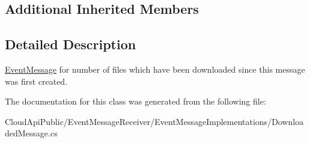 \subsection*{Additional Inherited Members}


\subsection{Detailed Description}
\hyperlink{class_cloud_api_public_1_1_event_message_receiver_1_1_event_message}{Event\-Message} for number of files which have been downloaded since this message was first created. 



The documentation for this class was generated from the following file\-:\begin{DoxyCompactItemize}
\item 
Cloud\-Api\-Public/\-Event\-Message\-Receiver/\-Event\-Message\-Implementations/Downloaded\-Message.\-cs\end{DoxyCompactItemize}
